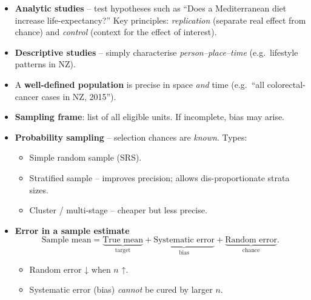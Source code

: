 \documentclass[12pt]{book}
\begin{document}
\begin{itemize}
  \setlength{\itemsep}{6pt}

  \item \textbf{Analytic studies} – test hypotheses such as  
        “Does a Mediterranean diet increase life-expectancy?”  
        Key principles: \emph{replication} (separate real effect from chance) and
        \emph{control} (context for the effect of interest).

  \item \textbf{Descriptive studies} – simply characterise \emph{person–place–time}
        (e.g.\ lifestyle patterns in NZ).

  \item A \textbf{well-defined population} is precise in space \emph{and} time  
        (e.g.\ “all colorectal-cancer cases in NZ, 2015”).
  \item \textbf{Sampling frame}: list of all eligible units.  
        If incomplete, bias may arise.

  \item \textbf{Probability sampling} – selection chances are
        \emph{known}.  
        \smallskip
        Types:
        \begin{itemize}
          \item Simple random sample (SRS).
          \item Stratified sample – improves precision; allows dis-proportionate
                strata sizes.
          \item Cluster / multi-stage – cheaper but less precise.
        \end{itemize}

  \item \textbf{Error in a sample estimate}
        \[
          \text{Sample mean}
          = \underbrace{\text{True mean}}_{\text{target}}
          + \underbrace{\text{Systematic error}}_{\text{bias}}
          + \underbrace{\text{Random error}}_{\text{chance}}.
        \]
        \begin{itemize}
          \item Random error ↓ when \(n\) ↑.
          \item Systematic error (bias) \emph{cannot} be cured by larger \(n\).
        \end{itemize}


\end{itemize}
\end{document}
